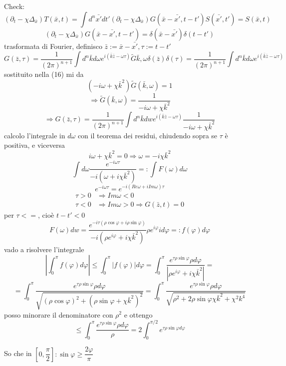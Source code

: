 \documentclass[a4paper,11pt]{report}
\begin{document}
Check: 
$$
(\partial_t-\chi\Delta_{\bar{x}})T(\bar{x},t)=\int d^n\bar{x'}dt'(\partial_t-\chi\Delta_{\bar{x}})G(\bar{x}-\bar{x'},t-t')S(\bar{x'},t')=S(\bar{x},t)
$$
$$
(\partial_t-\chi\Delta_{\bar{x}})G(\bar{x}-\bar{x'},t-t')=\delta(\bar{x}-\bar{x'})\delta(t-t')
$$
trasformata di Fourier, definisco $\bar{z}:=\bar{x}-\bar{x'}, \tau := t-t'$
$$
G(\bar{z},\tau)=\dfrac{1}{(2\pi)^{n+1}}\int d^n\bar{k}d\omega e^{i(\bar{k}\bar{z}-\omega\tau)}\tilde{G}{\bar{k},\omega}\delta(\bar{z})\delta(\tau)=\dfrac{1}{(2\pi)^{n+1}}\int d^n\bar{k}d\omega e^{i(\bar{k}\bar{z}-\omega\tau)}
$$
sostituito nella (16) mi da
$$
(-i\omega+\chi\bar{k}^2)\tilde{G}(\bar{k},\omega)=1
$$
$$
\Rightarrow\tilde{G}(\bar{k},\omega)=\dfrac{1}{-i\omega+\chi\bar{k}^2}
$$
$$
\Rightarrow G(\bar{z},\tau)=\dfrac{1}{(2\pi)^{n+1}}\int d^n\bar{k}dw e^{i(\bar{k}\bar{z}-\omega\tau)}\dfrac{1}{-i\omega+\chi\bar{k}^2}
$$
calcolo l'integrale in $d\omega$ con il teorema dei residui, chiudendo sopra se $\tau$ è positiva, e viceversa
$$
i\omega+\chi\bar{k}^2=0 \Rightarrow\omega=-i\chi\bar{k}^2
$$
$$
\int d\omega\dfrac{e^{-i\omega\tau}}{-i(\omega+i\chi\bar{k}^2)}=:\int F(\omega) d\omega
$$
$$
e^{-i\omega\tau}=e^{-i(Re\omega+iIm\omega)\tau}
$$
$$
\begin{matrix}
 \tau > 0 & \Rightarrow Im\omega <0\\ 
 \tau < 0 & \Rightarrow Im\omega>0 \Rightarrow G(\bar{z},t)=0
\end{matrix}
$$
per $\tau<=$, cioè $t-t'<0$
$$
F(\omega)dw=\dfrac{e^{-i\tau(\rho\cos\varphi+i\rho\sin\varphi)}}{-i(\rho e^{i\varphi}+i\chi\bar{k}^2)}\rho e^{i\varphi}id\varphi=:f(\varphi)d\varphi
$$
vado a risolvere l'integrale
$$
\left|\int_{0}^{\pi}f(\varphi)d\varphi\right|\leq\int_{0}^{\pi}\left|f(\varphi)\right|d\varphi=\int_{0}^{\pi}\dfrac{e^{\tau\rho\sin\varphi}\rho d\varphi}{\left|\rho e^{i\varphi}+i\chi\bar{k}^2\right|}=$$
$$=\int_{0}^{\pi}\dfrac{e^{\tau\rho\sin\varphi}\rho d\varphi}{\sqrt{(\rho\cos\varphi)^2+(\rho\sin\varphi+\chi\bar{k}^2)^2}}=\int_{0}^{\pi}\dfrac{e^{\tau\rho\sin\varphi}\rho d\varphi}{\sqrt{\rho^2+2\rho\sin\varphi\chi\bar{k}^2+\chi^2 k^4}}
$$
posso minorare il denominatore con $\rho^2$ e ottengo
$$
\leq\int_{0}^{\pi}\dfrac{e^{\tau\rho\sin\varphi}\rho d\varphi}{\rho}=2\int_{0}^{\pi/2}e^{\tau\rho\sin\varphi d\varphi}
$$


So che in $[0,\dfrac{\pi}{2}]: \sin\varphi\geq\dfrac{2\varphi}{\pi}$

\end{document}
